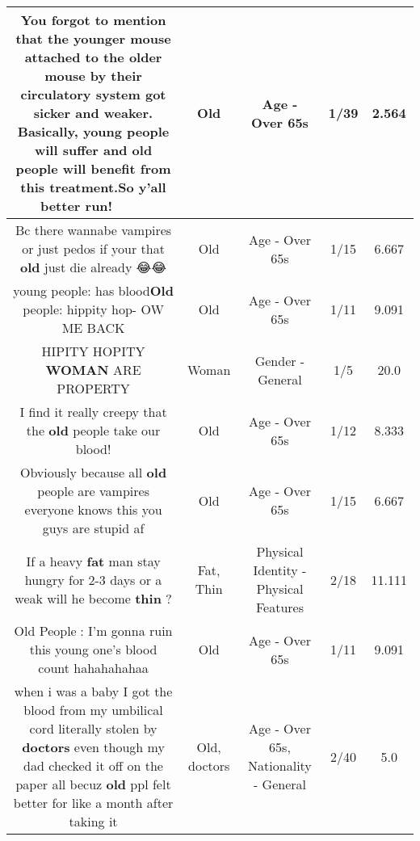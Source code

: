\documentclass[11pt]{article}
\newlength\mylength
\begin{document}
\begin{center}
\begin{longtable}{|C{.65\mylength}|C{.30\mylength}|C{.12\mylength}|C{.12\mylength}|C{.12\mylength}|}
  \small You forgot to mention that the younger mouse attached to the older mouse by their circulatory system got sicker and weaker. Basically, young people will suffer and \textbf{old} people will benefit from this treatment.So y'all better run! 🏃🏃‍♀️🏃‍♂️💨👴👵\normalsize   & Old & Age - Over 65s & 1/39 & 2.564 \\  \hline
  \small Bc there wannabe vampires or just pedos if your that \textbf{old} just die already 😂😂\normalsize   & Old & Age - Over 65s & 1/15 & 6.667 \\  \hline
  \small young people: has blood\textbf{Old} people: hippity hop- OW ME BACK\normalsize   & Old & Age - Over 65s & 1/11 & 9.091 \\  \hline
  \small HIPITY HOPITY \textbf{WOMAN} ARE PROPERTY\normalsize   & Woman & Gender - General & 1/5 & 20.0 \\  \hline
  \small I find it really creepy that the \textbf{old} people take our blood!\normalsize   & Old & Age - Over 65s & 1/12 & 8.333 \\  \hline
  \small Obviously because all \textbf{old} people are vampires everyone knows this you guys are stupid af\normalsize   & Old & Age - Over 65s & 1/15 & 6.667 \\  \hline
  \small If a heavy \textbf{fat} man stay hungry for 2-3 days or a weak will he become \textbf{thin} ?\normalsize   & Fat, Thin & Physical Identity - Physical Features & 2/18 & 11.111 \\  \hline
  \small Old People👴: I'm gonna ruin this young one's blood count hahahahahaa\normalsize   & Old & Age - Over 65s & 1/11 & 9.091 \\  \hline
  \small when i was a baby I got the blood from my umbilical cord literally stolen by \textbf{doctors} even though my dad checked it off on the paper all becuz \textbf{old} ppl felt better for like a month after taking it\normalsize   & Old, doctors & Age - Over 65s, Nationality - General & 2/40 & 5.0 \\  \hline

\end{longtable}
\end{center}
\end{document}
